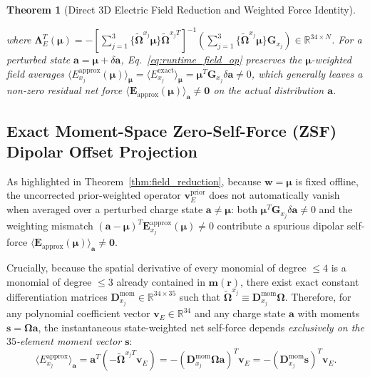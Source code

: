 \documentclass[11pt,a4paper]{article}
\newcommand{\bOmega}{\mathbf{\Omega}}
\newcommand{\bLambda}{\mathbf{\Lambda}}
\newtheorem{theorem}{Theorem}
\begin{document}
\begin{theorem}[Direct 3D Electric Field Reduction and Weighted Force Identity]
\begin{enumerate}
\begin{equation}
        \label{eq:runtime_field_op}
    \end{equation}
    where $\bLambda_E^T(\bm{\mu}) = -\left[\sum_{j=1}^3 \{\tilde{\bOmega}^{x_j}\bm{\mu}\}\tilde{\bOmega}^{x_j T}\right]^{-1} \left(\sum_{j=1}^3 \{\tilde{\bOmega}^{x_j}\bm{\mu}\}\bm{G}_{x_j}\right) \in \mathbb{R}^{34 \times N}$. For a perturbed state $\bm{a} = \bm{\mu} + \delta\bm{a}$, Eq.~\eqref{eq:runtime_field_op} preserves the $\bm{\mu}$-weighted field averages $\langle E_{x_j}^{\mathrm{approx}}(\bm{\mu})\rangle_{\bm{\mu}} = \langle E_{x_j}^{\mathrm{exact}}\rangle_{\bm{\mu}} = \bm{\mu}^T \bm{G}_{x_j}\delta\bm{a} \ne 0$, which generally leaves a non-zero residual net force $\langle \bm{E}_{\mathrm{approx}}(\bm{\mu})\rangle_{\bm{a}} \ne \bm{0}$ on the actual distribution $\bm{a}$.
\end{enumerate}
\end{theorem}

\subsection{Exact Moment-Space Zero-Self-Force (ZSF) Dipolar Offset Projection}
As highlighted in Theorem~\ref{thm:field_reduction}, because $\bm{w}=\bm{\mu}$ is fixed offline, the uncorrected prior-weighted operator $\bm{v}_E^{\mathrm{prior}}$ does not automatically vanish when averaged over a perturbed charge state $\bm{a} \ne \bm{\mu}$: both $\bm{\mu}^T \bm{G}_{x_j} \delta\bm{a} \ne 0$ and the weighting mismatch $(\bm{a} - \bm{\mu})^T \bm{E}_{x_j}^{\mathrm{approx}}(\bm{\mu}) \ne 0$ contribute a spurious dipolar self-force $\langle \bm{E}_{\mathrm{approx}}(\bm{\mu}) \rangle_{\bm{a}} \ne \bm{0}$.

Crucially, because the spatial derivative of every monomial of degree $\le 4$ is a monomial of degree $\le 3$ already contained in $\bm{m}(\bm{r})$, there exist exact constant differentiation matrices $\bm{D}_{x_j}^{\mathrm{mom}} \in \mathbb{R}^{34 \times 35}$ such that $\tilde{\bOmega}^{x_j} \equiv \bm{D}_{x_j}^{\mathrm{mom}} \bOmega$. Therefore, for any polynomial coefficient vector $\bm{v}_E \in \mathbb{R}^{34}$ and any charge state $\bm{a}$ with moments $\bm{s} = \bOmega\bm{a}$, the instantaneous state-weighted net self-force depends \emph{exclusively on the $35$-element moment vector $\bm{s}$}:
\begin{equation}
    \langle E_{x_j}^{\mathrm{approx}} \rangle_{\bm{a}} = \bm{a}^T \left( -\tilde{\bOmega}^{x_j T} \bm{v}_E \right) = -\left( \bm{D}_{x_j}^{\mathrm{mom}} \bOmega \bm{a} \right)^T \bm{v}_E = -\left( \bm{D}_{x_j}^{\mathrm{mom}} \bm{s} \right)^T \bm{v}_E.
    \label{eq:moment_space_selfforce}
\end{equation}
\end{document}
